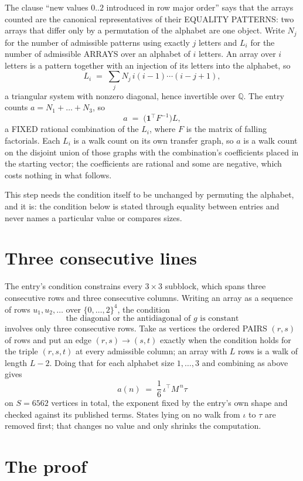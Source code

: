 \documentclass[11pt,a4paper]{article}
\theoremstyle{plain}
\theoremstyle{definition}
\begin{document}
The clause ``new values $0..2$ introduced in row major order'' says that the arrays
counted are the canonical representatives of their EQUALITY PATTERNS: two arrays that differ
only by a permutation of the alphabet are one object. Write $N_j$ for the number of admissible
patterns using exactly $j$ letters and $L_i$ for the number of admissible ARRAYS over an
alphabet of $i$ letters. An array over $i$ letters is a pattern together with an injection of
its letters into the alphabet, so
\[
L_i\;=\;\sum_{j}N_j\,i(i-1)\cdots(i-j+1),
\]
a triangular system with nonzero diagonal, hence invertible over $\mathbb{Q}$. The entry
counts $a=N_1+\dots+N_{3}$, so
\[
a\;=\;\bigl(\mathbf{1}^{\!\top}F^{-1}\bigr)L ,
\]
a FIXED rational combination of the $L_i$, where $F$ is the matrix of falling factorials.
Each $L_i$ is a walk count on its own transfer graph, so $a$ is a walk count on the disjoint
union of those graphs with the combination's coefficients placed in the starting vector; the
coefficients are rational and some are negative, which costs nothing in what follows.

This step needs the condition itself to be unchanged by permuting the alphabet, and it is:
the condition below is stated through equality between entries and never names a particular
value or compares sizes.

\section{Three consecutive lines}

The entry's condition constrains every $3\times3$ subblock, which spans three consecutive
rows and three consecutive columns. Writing an array as a sequence of rows
$u_1,u_2,\dots$ over $\{0,\dots,2\}^{4}$, the condition
\[
\text{the diagonal or the antidiagonal of }g\text{ is constant}
\]
involves only three consecutive rows. Take as vertices the ordered PAIRS $(r,s)$ of
rows and put an edge $(r,s)\to(s,t)$ exactly when the condition holds for the triple
$(r,s,t)$ at every admissible column; an array with $L$ rows is a walk of length $L-2$.
Doing that for each alphabet size $1,\dots,3$ and combining as above gives
\[
a(n)\;=\;\frac{1}{6}\,\iota^{\!\top}M^{\,n}\tau
\]
on $S=6562$ vertices in total, the exponent fixed by the entry's own shape and checked against
its published terms. States lying on no walk from $\iota$ to $\tau$ are removed first; that
changes no value and only shrinks the computation.

\section{The proof}
\end{document}
